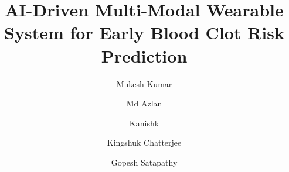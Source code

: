 \documentclass[3p,times,procedia]{elsarticle}
\begin{document}
\begin{frontmatter}




\title{AI-Driven Multi-Modal Wearable System for Early Blood Clot Risk Prediction}




\author[a]{Mukesh Kumar}
\author[b]{Md Azlan}
\author[c]{Kanishk}
\author[d]{Kingshuk Chatterjee}
\author[e]{Gopesh Satapathy}


\address[a]{School of Computer Engineering, Kalinga Institute of Industrial Technology, Bhubaneswar-751024, India}
\address[b]{School of Computer Engineering, Kalinga Institute of Industrial Technology, Bhubaneswar-751024, India}
\address[c]{School of Computer Engineering, Kalinga Institute of Industrial Technology, Bhubaneswar-751024, India}
\address[d]{School of Computer Engineering, Kalinga Institute of Industrial Technology, Bhubaneswar-751024, India}
\address[e]{School of Computer Engineering, Kalinga Institute of Industrial Technology, Bhubaneswar-751024, India}





\end{frontmatter}
\end{document}
